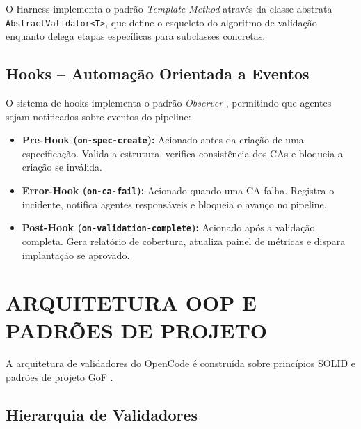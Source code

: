 \documentclass[
  brazil,
  sumario=tradicional,
  10pt
]{abntex2}
\begin{document}
O Harness implementa o padrão \textit{Template Method} através da classe
abstrata \texttt{AbstractValidator<T>}, que define o esqueleto do
algoritmo de validação enquanto delega etapas específicas para
subclasses concretas.

\subsection{Hooks -- Automação Orientada a Eventos}

O sistema de hooks implementa o padrão \textit{Observer} \cite{gamma1995design},
permitindo que agentes sejam notificados sobre eventos do pipeline:

\begin{itemize}
  \item \textbf{Pre-Hook (\texttt{on-spec-create}):} Acionado antes da
    criação de uma especificação. Valida a estrutura, verifica
    consistência dos CAs e bloqueia a criação se inválida.
  \item \textbf{Error-Hook (\texttt{on-ca-fail}):} Acionado quando uma
    CA falha. Registra o incidente, notifica agentes responsáveis e
    bloqueia o avanço no pipeline.
  \item \textbf{Post-Hook (\texttt{on-validation-complete}):} Acionado
    após a validação completa. Gera relatório de cobertura, atualiza
    painel de métricas e dispara implantação se aprovado.
\end{itemize}

\section{ARQUITETURA OOP E PADRÕES DE PROJETO}

A arquitetura de validadores do OpenCode é construída sobre princípios
SOLID \cite{martin2000principles} e padrões de projeto GoF
\cite{gamma1995design}.

\subsection{Hierarquia de Validadores}
\end{document}
